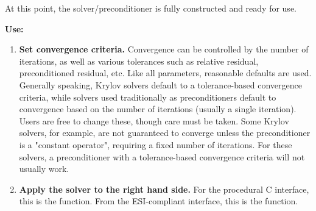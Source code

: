 At this point, the solver/preconditioner is fully constructed and ready for use. 

{\bf Use:}

\begin{enumerate}

\item
{\bf Set convergence criteria.} Convergence can be controlled by the number of iterations,
as well as various tolerances such as relative residual, preconditioned residual, etc.
Like all parameters, reasonable defaults are used. Generally speaking, Krylov solvers
default to a tolerance-based convergence criteria, while solvers used traditionally as
preconditioners default to convergence based on the number of iterations (usually a single
iteration). Users are free to change these, though care must be taken. Some Krylov solvers,
for example, are not guaranteed to converge unless the preconditioner is a "constant operator",
requiring a fixed number of iterations. For these solvers, a preconditioner
with a tolerance-based convergence criteria will not usually work.

\item
{\bf Apply the solver to the right hand side.} For the procedural C interface, this is the 
 function. From the ESI-compliant interface, this is the  function.

\end{enumerate}
